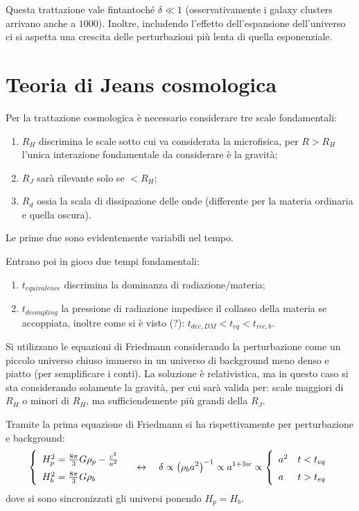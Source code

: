 \vspace{1em}
\noindent Questa trattazione vale fintantoché $\delta \ll 1$ (osservativamente i galaxy clusters arrivano anche a $1000$). Inoltre, includendo l'effetto dell'espansione dell'universo ci si aspetta una crescita delle perturbazioni più lenta di quella esponenziale.


\newpage
\section{Teoria di Jeans cosmologica}
Per la trattazione cosmologica è necessario considerare tre scale fondamentali:
\begin{enumerate}
    \item $R_H$ discrimina le scale sotto cui va considerata la microfisica, per $R>R_H$ l'unica interazione fondamentale da considerare è la gravità;
    \item $R_J$ sarà rilevante solo se $<R_H$;
    \item $R_d$ ossia la scala di dissipazione delle onde (differente per la materia ordinaria e quella oscura).
\end{enumerate}
Le prime due sono evidentemente variabili nel tempo.

Entrano poi in gioco due tempi fondamentali:
\begin{enumerate}
    \item $t_{equivalence}$ discrimina la dominanza di radiazione/materia;
    \item $t_{decoupling}$ la pressione di radiazione impedisce il collasso della materia se accoppiata, inoltre come si è visto (?): $t_{dec,DM} < t_{eq} < t_{rec,b}$.
\end{enumerate}

Si utilizzano le equazioni di Friedmann considerando la perturbazione come un piccolo universo chiuso immerso in un universo di background meno denso e piatto (per semplificare i conti). La soluzione è relativistica, ma in questo caso si sta considerando solamente la gravità, per cui sarà valida per: scale maggiori di $R_H$ o minori di $R_H$, ma sufficiendemente più grandi della $R_J$. 

Tramite la prima equazione di Friedmann si ha rispettivamente per perturbazione e background:
\begin{equation}\left\{
    \def\arraystretch{1.5}
        \begin{array}{l}
            H_p^2=\frac{8\pi }{3}G \rho_p - \frac{c^2}{a^2}\\
            H_b^2 =\frac{8\pi}{3}G \rho_b
    \end{array}\right. \quad\leftrightarrow\quad \delta \propto \left(\rho_b a^2\right)^{-1}\propto a^{1+3w}\propto
    \left\{
   \begin{array}{ll}
        a^2 & t<t_{eq}\\
        a & t>t_{eq}
\end{array}\right. 
\end{equation}
dove si sono sincronizzati gli universi ponendo $H_p=H_b$.

